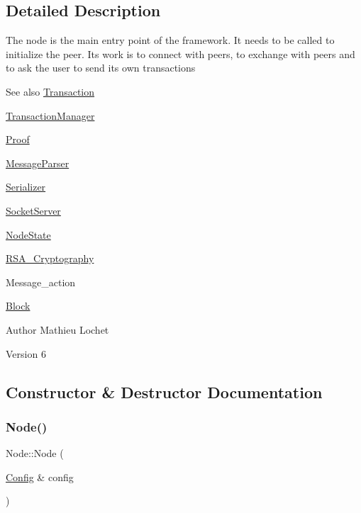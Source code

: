 \subsection{Detailed Description}
The node is the main entry point of the framework. It needs to be called to initialize the peer. Its work is to connect with peers, to exchange with peers and to ask the user to send its own transactions \begin{DoxySeeAlso}{See also}
\mbox{\hyperlink{classTransaction}{Transaction}} 

\mbox{\hyperlink{classTransactionManager}{Transaction\+Manager}} 

\mbox{\hyperlink{classProof}{Proof}} 

\mbox{\hyperlink{classMessageParser}{Message\+Parser}} 

\mbox{\hyperlink{classSerializer}{Serializer}} 

\mbox{\hyperlink{classSocketServer}{Socket\+Server}} 

\mbox{\hyperlink{classNodeState}{Node\+State}} 

\mbox{\hyperlink{classRSA__Cryptography}{R\+S\+A\+\_\+\+Cryptography}} 

Message\+\_\+action 

\mbox{\hyperlink{classBlock}{Block}}
\end{DoxySeeAlso}
\begin{DoxyAuthor}{Author}
Mathieu Lochet 
\end{DoxyAuthor}
\begin{DoxyVersion}{Version}
6 
\end{DoxyVersion}


\subsection{Constructor \& Destructor Documentation}
\mbox{\label{classNode_a08648d758d45b9dc38de5731c5b83b51}} 
\subsubsection{\texorpdfstring{Node()}{Node()}}
{\footnotesize\ttfamily Node\+::\+Node (\begin{DoxyParamCaption}\item[{\mbox{\hyperlink{classConfig}{Config}} \&}]{config }\end{DoxyParamCaption})}

